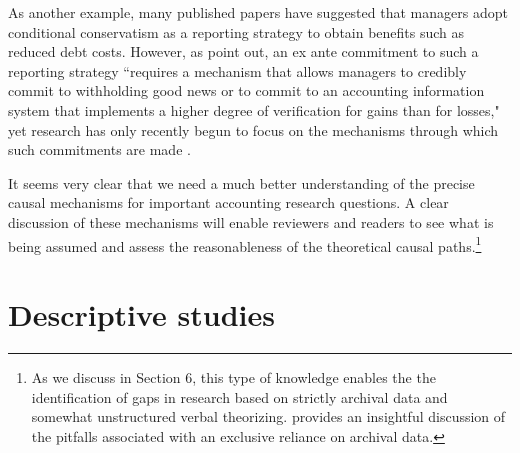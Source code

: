 \documentclass[12pt,reqno,titlepage]{amsart}
\begin{document}
\begin{doublespace}
As another example, many published papers have suggested that managers adopt conditional conservatism as a reporting strategy to obtain benefits such as reduced debt costs. %
However, as \citet[p\,317]{Beyer:2010cj} point out, an ex ante commitment to such a reporting strategy ``requires a mechanism that allows managers to credibly commit to withholding good news or to commit to an accounting information system that implements a higher degree of verification for gains than for losses," yet research has only recently begun to focus on the mechanisms through which such commitments are made \citep[e.g.,][]{Erkens:2014hj}.

It seems very clear that we need a much better understanding of the precise causal mechanisms for important accounting research questions. A clear discussion of these mechanisms will enable reviewers and readers to see what is being assumed and assess the reasonableness of the theoretical causal paths.\footnote{ As we discuss in Section 6, this type of knowledge enables the the identification of gaps in research based on strictly archival data and somewhat unstructured verbal theorizing. \cite{Soltes:2014gr} provides an insightful discussion of the pitfalls associated with an exclusive reliance on archival data.} 




\section{Descriptive studies} \label{sec:desc}


\end{doublespace}
\end{document}
